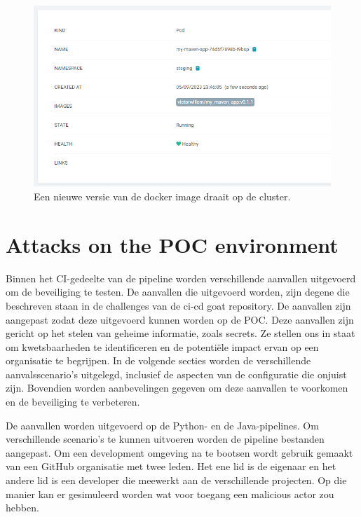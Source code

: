 \begin{enumerate}
  \begin{figure}[H]
    \includegraphics[scale=0.48]{graphics/0.1.1newimage.png}
  \caption{\label{fig:newimage} Een nieuwe versie van de docker image draait op de cluster.}
  \end{figure}
\end{enumerate}

\section{
{Attacks on the POC environment}}
\label{sec:Aanvallen op de POC omgeving}

Binnen het CI-gedeelte van de pipeline worden verschillende aanvallen uitgevoerd om de beveiliging te testen. De aanvallen die uitgevoerd worden, zijn degene die beschreven staan in de challenges van de ci-cd goat repository. \autocite{Cider2022} De aanvallen zijn aangepast zodat deze uitgevoerd kunnen worden op de POC. Deze aanvallen zijn gericht op het stelen van geheime informatie, zoals secrets. Ze stellen ons in staat om kwetsbaarheden te identificeren en de potentiële impact ervan op een organisatie te begrijpen. In de volgende secties worden de verschillende aanvalsscenario's uitgelegd, inclusief de aspecten van de configuratie die onjuist zijn. Bovendien worden aanbevelingen gegeven om deze aanvallen te voorkomen en de beveiliging te verbeteren.
\newline
     
De aanvallen worden uitgevoerd op de Python- en de Java-pipelines. Om verschillende scenario's te kunnen uitvoeren worden de pipeline bestanden aangepast. Om een development omgeving na te bootsen wordt gebruik gemaakt van een GitHub organisatie met twee leden. Het ene lid is de eigenaar en het andere lid is een developer die meewerkt aan de verschillende projecten. Op die manier kan er gesimuleerd worden wat voor toegang een malicious actor zou hebben.
\newline

